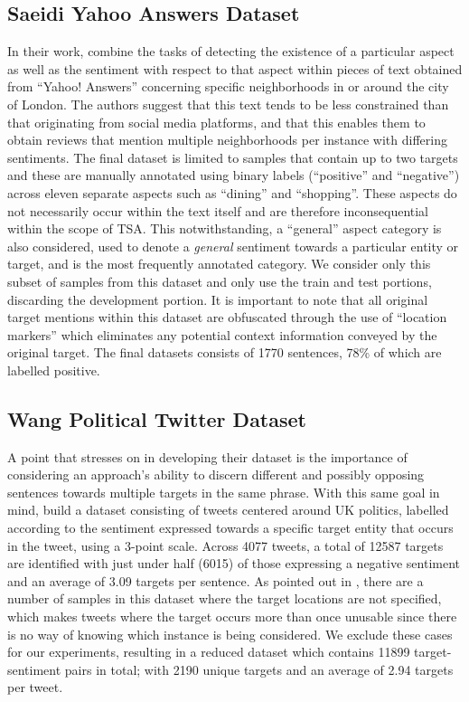 \documentclass[../../fyp.tex]{subfiles}
\begin{document}
\subsection{Saeidi Yahoo Answers Dataset} \label{ds:saeidi}
In their work, \citet{saeidi2016} combine the tasks of detecting the existence of a particular aspect as well as the sentiment with respect to that aspect within pieces of text obtained from \enquote{Yahoo! Answers} concerning specific neighborhoods in or around the city of London. The authors suggest that this text tends to be less constrained than that originating from social media platforms, and that this enables them to obtain reviews that mention multiple neighborhoods per instance with differing sentiments. The final dataset is limited to samples that contain up to two targets and these are manually annotated using binary labels (\enquote{positive} and \enquote{negative}) across eleven separate aspects such as \enquote{dining} and \enquote{shopping}. These aspects do not necessarily occur within the text itself and are therefore inconsequential within the scope of TSA. This notwithstanding, a \enquote{general} aspect category is also considered, used to denote a \textit{general} sentiment towards a particular entity or target, and is the most frequently annotated category. We consider only this subset of samples from this dataset and only use the train and test portions, discarding the development portion. It is important to note that all original target mentions within this dataset are obfuscated through the use of \enquote{location markers} which eliminates any potential context information conveyed by the original target. The final datasets consists of 1770 sentences, 78\% of which are labelled positive. 

\subsection{Wang Political Twitter Dataset} \label{ds:wang} 
A point that \citet{saeidi2016} stresses on in developing their dataset is the importance of considering an approach's ability to discern different and possibly opposing sentences towards multiple targets in the same phrase. With this same goal in mind, \citet{wang2017} build a dataset consisting of tweets centered around UK politics, labelled according to the sentiment expressed towards a specific target entity that occurs in the tweet, using a 3-point scale. Across 4077 tweets, a total of 12587 targets are identified with just under half (6015) of those expressing a negative sentiment and an average of 3.09 targets per sentence. As pointed out in \citet{moore2018}, there are a number of samples in this dataset where the target locations are not specified, which makes tweets where the target occurs more than once unusable since there is no way of knowing which instance is being considered. We exclude these cases for our experiments, resulting in a reduced dataset which contains 11899 target-sentiment pairs in total; with 2190 unique targets and an average of 2.94 targets per tweet.
\end{document}
